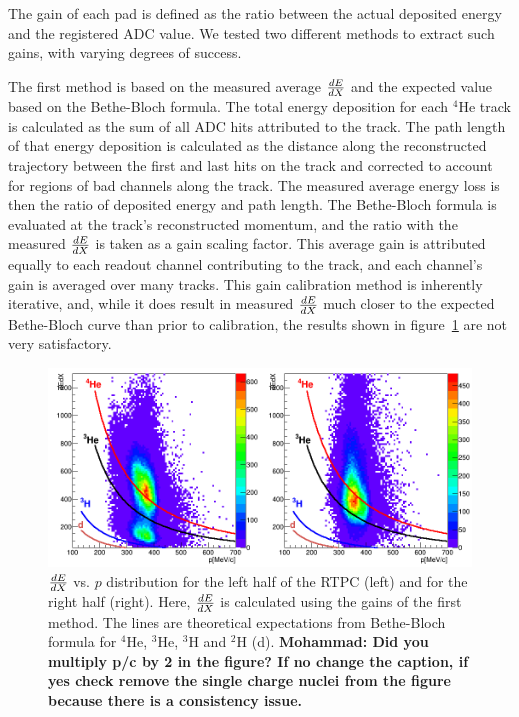 \documentclass[twocolumn,showpacs,superscriptaddress,groupedaddress]{revtex4}
\begin{document}
The gain of each pad is defined as the ratio between the actual 
deposited energy and the registered ADC value. We tested two different 
methods to extract such gains, with varying degrees of success.

The first method is based on the measured average $\small{\frac{dE}{dX}}$
and the expected value based on the Bethe-Bloch formula. The total energy
deposition for each $^4$He track is calculated as the sum of all ADC hits
attributed to the track. The path length of that energy deposition is
calculated as the distance along the reconstructed trajectory between the first
and last hits on the track and corrected to account for regions
of bad channels along the track. The measured average energy loss is then the
ratio of deposited energy and path length. The Bethe-Bloch formula is
evaluated at the track's reconstructed momentum, and the ratio with the measured
$\small{\frac{dE}{dX}}$ is taken as a gain scaling factor. This average gain is
attributed equally to each readout channel contributing to the track, and each
channel's gain is averaged over many tracks. This gain calibration method is
inherently iterative, and, while it does result in measured $\small{\frac{dE}{dX}}$
much closer to the expected Bethe-Bloch curve than prior to calibration, the
results shown in figure~\ref{fig:dedx_p_exp_1st} are not very satisfactory.

\begin{figure}[tb]
   \includegraphics[scale=0.26]{fig/dedx_p_exp_1st.png}
   \caption{$\small{\frac{dE}{dX}}$ vs. $p$ distribution for the left half of the 
      RTPC (left) and for the right half (right). Here, $\small{\frac{dE}{dX}}$ 
   is calculated using the gains of the first method.  The lines are 
theoretical expectations from Bethe-Bloch formula for $^4$He, $^3$He, $^3$H and 
$^2$H (d).{\bf \color{red} Mohammad: Did you multiply p/c by 2 in the figure? If no 
change the caption, if yes check remove the single charge nuclei from the figure 
because there is a consistency issue.}}
\label{fig:dedx_p_exp_1st}
\end{figure}
\end{document}
